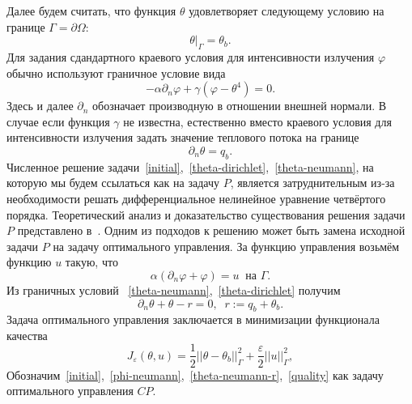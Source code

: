 \documentclass[10pt]{article}
\begin{document}
    Далее будем считать, что функция $\theta$ удовлетворяет следующему условию на границе
    $\Gamma = \partial \Omega$:
    \begin{equation}
        \label{theta-dirichlet}
        \theta|_\Gamma = \theta_b.
    \end{equation}
    Для задания сдандартного краевого условия для интенсивности излучения $\varphi$ обычно
    используют граничное условие вида
    \begin{equation}
        \label{phi-default}
        - \alpha \partial_n \varphi + \gamma (\varphi - \theta ^4) = 0.
    \end{equation}
    Здесь и далее $\partial_n$ обозначает производную в отношении внешней нормали.
    В случае если функция $\gamma$ не известна, естественно вместо краевого условия для
    интенсивности излучения задать значение теплового потока на границе
    \begin{equation}
        \label{theta-neumann}
        \partial_n \theta = q_b.
    \end{equation}
    Численное решение
    задачи~\eqref{initial},~\eqref{theta-dirichlet},~\eqref{theta-neumann},
    на которую мы будем ссылаться как на задачу $P$, является затруднительным из-за необходимости
    решать дифференциальное нелинейное уравнение четвёртого порядка.
    Теоретический анализ и доказательство существования решения задачи $P$ представлено
    в~\cite{cheb-same}.
    Одним из подходов к решению может быть замена исходной задачи $P$ на задачу
    оптимального управления.
    За функцию управления возьмём функцию $u$ такую, что
    \begin{equation}
        \label{phi-boundary}
        \alpha (\partial_n \varphi + \varphi) = u \;\; \text{на } \Gamma.
    \end{equation}
    Из граничных условий ~\eqref{theta-neumann},~\eqref{theta-dirichlet} получим
    \begin{equation}
        \label{theta-boundary}
        \partial_n \theta  + \theta - r = 0, \;\; r := q_b + \theta_b.
    \end{equation}
    Задача оптимального управления заключается в минимизации функционала качества
    \begin{equation}
        \label{quality}
        J_\varepsilon(\theta, u) = \frac{1}{2} ||\theta - \theta_b||^2_\Gamma + \frac{\varepsilon}{2}||u||^2_\Gamma,
    \end{equation}
    Обозначим~\eqref{initial},~\eqref{phi-neumann},~\eqref{theta-neumann-r},~\eqref{quality}
    как задачу оптимального управления $CP$.
\end{document}
